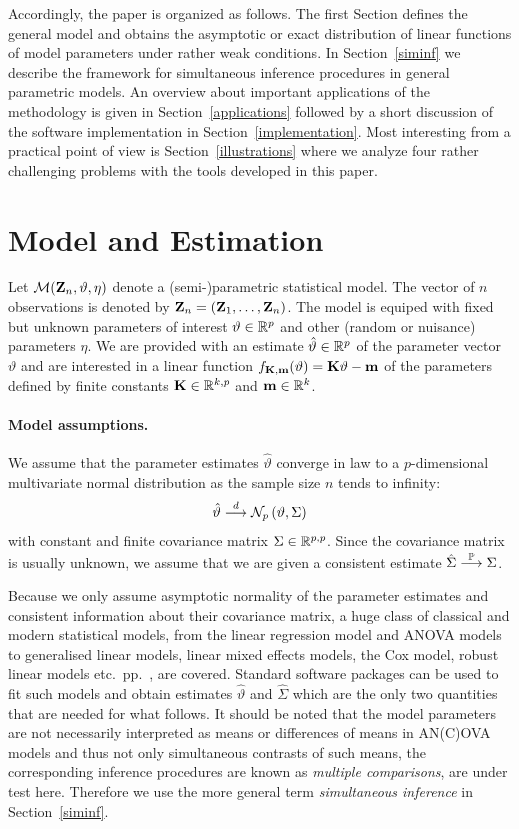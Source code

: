 \documentclass[12pt]{article}
\begin{document}
Accordingly, the paper is organized as follows. 
The first Section defines the general model and obtains 
the asymptotic or exact distribution of linear functions
of model parameters under rather weak conditions. 
In Section~\ref{siminf} we
describe the framework for simultaneous inference
procedures in general parametric models. An overview about important applications
of the methodology is given in Section~\ref{applications} followed
by a short discussion of the software implementation in Section~\ref{implementation}.
Most interesting from a practical point of view is
Section~\ref{illustrations} where we analyze four rather challenging
problems with the tools developed in this paper.


\section{Model and Estimation} \label{model}

Let $\mathcal{M}(\mathbf{Z}_n, \vartheta, \eta)$ denote a (semi-)parametric statistical model.
The vector of $n$ observations is denoted by $\mathbf{Z}_n = (\mathbf{Z}_1, \dots, \mathbf{Z}_n)$. 
The model is equiped with fixed
but unknown parameters of interest $\vartheta \in \mathbb{R}^p$ 
and other (random or nuisance) parameters $\eta$. We are provided 
with an estimate $\hat{\vartheta} \in \mathbb{R}^p$ of the parameter 
vector $\vartheta$ and are interested in a linear
function $f_{\mathbf{K}, \mathbf{m}}(\vartheta) = \mathbf{K} \vartheta - \mathbf{m}$
of the parameters defined by finite constants $\mathbf{K} \in \mathbb{R}^{k, p}$
and $\mathbf{m} \in \mathbb{R}^k$.

\paragraph{Model assumptions.}

We assume that the parameter estimates $\hat{\vartheta}$ converge in law
to a $p$-dimensional multivariate normal distribution as the sample
size $n$ tends to infinity:
\begin{eqnarray} \label{normality}
\hat{\vartheta} \stackrel{d}{\longrightarrow} \mathcal{N}_p\left(\vartheta, \Sigma\right)
\end{eqnarray}
with constant and finite covariance matrix $\Sigma \in \mathbb{R}^{p,p}$.
Since the covariance matrix is usually unknown, we assume 
that we are given a consistent estimate $\hat{\Sigma} \stackrel{\mathbb{P}}{\longrightarrow} \Sigma$.

Because we only assume asymptotic normality of the parameter estimates
and consistent information about their covariance matrix,
a huge class of classical and modern statistical models, from the linear
regression model and ANOVA models to generalised linear models, linear mixed
effects models, the Cox model, robust linear models etc.~pp.~, are 
covered. Standard software packages can be used to fit such models
and obtain estimates $\hat{\vartheta}$ and $\hat{\Sigma}$ which
are the only two quantities that are needed for what follows.
It should be noted that the model parameters are not necessarily
interpreted as means or differences of means in AN(C)OVA models
and thus not only simultaneous contrasts of such means, the corresponding
inference procedures are known as \emph{multiple comparisons}, 
are under test here. Therefore we use the more general term
\emph{simultaneous inference} in Section~\ref{siminf}.
\end{document}

